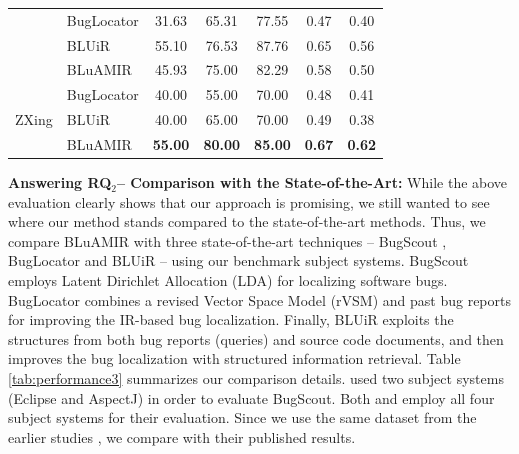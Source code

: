 \documentclass[sigconf,review,anonymous]{acmart}
\begin{document}
\begin{table}[!tb]
{\begin{tabular}{l|l|c|c|c|c|c}
			& BugLocator & 31.63 & 65.31 & 77.55 & 0.47 & 0.40 \\  \cline{2-7} 
			& BLUiR & 55.10 & 76.53 & 87.76 & 0.65  & 0.56 \\  \cline{2-7} &BLuAMIR                                                                     & 45.93                                               & 75.00                                              & 82.29                                             &   0.58  &   0.50  \\ \hline \hline
			\multirow{4}{*}{ZXing}                  
			
			
			& BugLocator & 40.00 & 55.00 & 70.00 & 0.48 & 0.41 \\  \cline{2-7}  
			& BLUiR & 40.00 & 65.00 & 70.00 & 0.49  & 0.38 \\  \cline{2-7}
			&BLuAMIR                                                                  & \textbf{55.00}                                            & \textbf{80.00}                                           & \textbf{85.00}                                             &   \textbf{0.67}  &  \textbf{0.62}   \\ \hline
			
			
			
			
		\end{tabular}
		
	}
	\centering
\end{table}
\textbf{Answering RQ$_2$-- Comparison with the State-of-the-Art:} While the above evaluation clearly shows that our approach is promising, we still wanted to see where our method stands compared to the state-of-the-art methods. Thus, 
we compare BLuAMIR with three state-of-the-art techniques -- BugScout \cite{Nguyen}, BugLocator \cite{Jian} and BLUiR \cite{Saha} -- using our benchmark subject systems. 
BugScout employs Latent Dirichlet Allocation (LDA) for localizing software bugs. BugLocator combines a revised Vector Space Model (rVSM) and past bug reports for improving the IR-based bug localization. Finally, BLUiR exploits the structures from both bug reports (queries) and source code documents, and then improves the bug localization with structured information retrieval.    
Table \ref{tab:performance3} summarizes our comparison details.
\citet{Nguyen} used two subject systems (Eclipse and AspectJ) in order to evaluate BugScout.
Both \citet{Saha} and \citet{Jian} employ all four subject systems for their evaluation. Since we use the same dataset from the earlier studies \cite{Saha,Jian}, we compare with their published results. 
\end{document}
